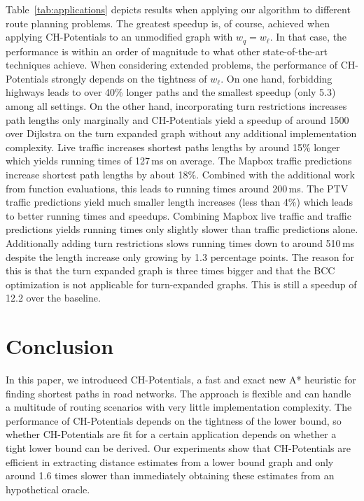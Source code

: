 \documentclass[letterpaper]{article} %
\begin{document}
Table~\ref{tab:applications} depicts results when applying our algorithm to different route planning problems.
The greatest speedup is, of course, achieved when applying CH-Potentials to an unmodified graph with $w_q = w_\ell$.
In that case, the performance is within an order of magnitude to what other state-of-the-art techniques achieve.
When considering extended problems, the performance of CH-Potentials strongly depends on the tightness of $w_\ell$.
On one hand, forbidding highways leads to over 40\% longer paths and the smallest speedup (only 5.3) among all settings.
On the other hand, incorporating turn restrictions increases path lengths only marginally and CH-Potentials yield a speedup of around 1500 over Dijkstra on the turn expanded graph without any additional implementation complexity.
Live traffic increases shortest paths lengths by around 15\% longer which yields running times of 127\,ms on average.
The Mapbox traffic predictions increase shortest path lengths by about 18\%.
Combined with the additional work from function evaluations, this leads to running times around 200\,ms.
The PTV traffic predictions yield much smaller length increases (less than 4\%) which leads to better running times and speedups.
Combining Mapbox live traffic and traffic predictions yields running times only slightly slower than traffic predictions alone.
Additionally adding turn restrictions slows running times down to around 510\,ms despite the length increase only growing by 1.3 percentage points.
The reason for this is that the turn expanded graph is three times bigger and that the BCC optimization is not applicable for turn-expanded graphs.
This is still a speedup of 12.2 over the baseline.

\section{Conclusion}
\label{sec:conclusion}

In this paper, we introduced CH-Potentials, a fast and exact new A* heuristic for finding shortest paths in road networks.
The approach is flexible and can handle a multitude of routing scenarios with very little implementation complexity.
The performance of CH-Potentials depends on the tightness of the lower bound, so whether CH-Potentials are fit for a certain application depends on whether a tight lower bound can be derived.
Our experiments show that CH-Potentials are efficient in extracting distance estimates from a lower bound graph and only around 1.6 times slower than immediately obtaining these estimates from an hypothetical oracle.



\pagebreak



\end{document}
